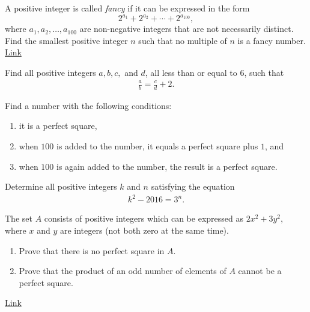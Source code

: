 \begin{problem}[APMO]
	A positive integer is called \textit{fancy} if it can be expressed in the form $$2^{a_1}+2^{a_2}+ \cdots+ 2^{a_{100}},$$ where $a_1,a_2, \ldots, a_{100}$ are non-negative integers that are not necessarily distinct. Find the smallest positive integer $n$ such that no multiple of $n$ is a fancy number. \flushright \href{http://artofproblemsolving.com/community/c6h1243426p6362865}{Link}
\end{problem}


\begin{problem}
	Find all positive integers $a,b,c,$ and $d$, all less than or equal to $6$, such that
	\begin{align*}
	\frac{a}{b} = \frac{c}{d} + 2.
	\end{align*}
\end{problem}



\begin{problem}
	Find a number with the following conditions:
	\begin{enumerate}
		\item it is a perfect square,
		\item when $100$ is added to the number, it equals a perfect square plus $1$, and
		\item when $100$ is again added to the number, the result is a perfect square.
	\end{enumerate}
\end{problem}




\begin{problem}
	Determine all positive integers $k$ and $n$ satisfying the equation
	\begin{align*}
	k^2 - 2016 = 3^n.
	\end{align*}
\end{problem}



\begin{problem}
	The set $A$ consists of positive integers which can be expressed as $2x^2+3y^2,$ where $x$ and $y$ are integers (not both zero at the same time).
	\begin{enumerate}
		\item Prove that there is no perfect square in $A$.
		\item Prove that the product of an odd number of elements of $A$ cannot be a perfect square.
	\end{enumerate}
	\flushright \href{http://artofproblemsolving.com/community/c6h1201200p5906668}{Link}
\end{problem}


